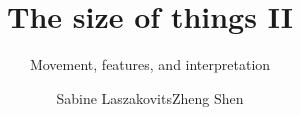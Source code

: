 \title{The size of \newlineCover things II}
\subtitle{Movement, features, and interpretation}
\author{Sabine Laszakovits\lastand Zheng Shen}
\renewcommand{\lsSeries}{ogs}%
\renewcommand{\lsSeriesNumber}{}

%
%

\renewcommand{\lsCoverTitleFont}[1]{%
    \sffamily\addfontfeatures{Scale=MatchUppercase}%
    \fontsize{46pt}{15mm}\selectfont #1}

